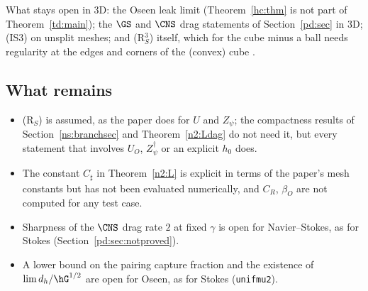 \begin{remark}
What stays open in 3D: the Oseen leak limit (Theorem~\ref{hc:thm} is not part of Theorem~\ref{td:main}); the $\GS$ and $\CNS$ drag
statements of Section~\ref{pd:sec} in 3D; (IS3) on unsplit meshes; and (R$_S^3$) itself, which for the cube minus a ball needs regularity at
the edges and corners of the (convex) cube \cite{Dauge1989}. %
\end{remark}

\subsection{What remains}\label{n2:open}
\begin{itemize}
\item (R$_S$) is assumed, as the paper does for $U$ and $Z_\psi$; the compactness results of Section~\ref{ns:branchsec} and Theorem~\ref{n2:Ldag} do
not need it, but every statement that involves $U_O$, $Z^\dagger_\psi$ or an explicit $h_0$ does.
\item The constant $C_\sharp$ in Theorem~\ref{n2:L} is explicit in terms of the paper's mesh constants but has not been evaluated numerically, and
$C_R$, $\beta_O$ are not computed for any test case.
\item Sharpness of the $\CNS$ drag rate $2$ at fixed $\gamma$ is open for Navier--Stokes, as for Stokes (Section~\ref{pd:sec:notproved}).
\item A lower bound on the pairing capture fraction and the existence of $\lim d_h/\hG^{1/2}$ are open for Oseen, as for Stokes (\texttt{unifmu2}).
\end{itemize}

